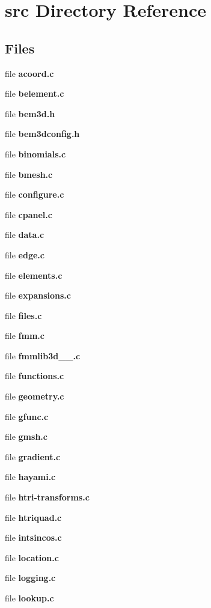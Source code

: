 \section{src Directory Reference}
\label{dir_68267d1309a1af8e8297ef4c3efbcdba}
\subsection*{Files}
\begin{DoxyCompactItemize}
\item 
file {\bfseries acoord.\+c}
\item 
file {\bfseries belement.\+c}
\item 
file {\bfseries bem3d.\+h}
\item 
file {\bfseries bem3dconfig.\+h}
\item 
file {\bfseries binomials.\+c}
\item 
file {\bfseries bmesh.\+c}
\item 
file {\bfseries configure.\+c}
\item 
file {\bfseries cpanel.\+c}
\item 
file {\bfseries data.\+c}
\item 
file {\bfseries edge.\+c}
\item 
file {\bfseries elements.\+c}
\item 
file {\bfseries expansions.\+c}
\item 
file {\bfseries files.\+c}
\item 
file {\bfseries fmm.\+c}
\item 
file {\bfseries fmmlib3d\+\_\+\_.\+c}
\item 
file {\bfseries functions.\+c}
\item 
file {\bfseries geometry.\+c}
\item 
file {\bfseries gfunc.\+c}
\item 
file {\bfseries gmsh.\+c}
\item 
file {\bfseries gradient.\+c}
\item 
file {\bfseries hayami.\+c}
\item 
file {\bfseries htri-\/transforms.\+c}
\item 
file {\bfseries htriquad.\+c}
\item 
file {\bfseries intsincos.\+c}
\item 
file {\bfseries location.\+c}
\item 
file {\bfseries logging.\+c}
\item 
file {\bfseries lookup.\+c}

\end{DoxyCompactItemize}

